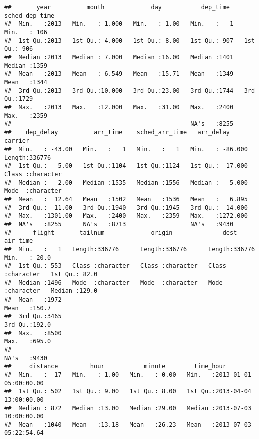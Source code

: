 \documentclass{article}\usepackage[]{graphicx}\usepackage[]{xcolor}
\makeatletter
\newenvironment{kframe}{%
 \def\at@end@of@kframe{}%
 \ifinner\ifhmode%
  \def\at@end@of@kframe{\end{minipage}}%
  \begin{minipage}{\columnwidth}%
 \fi\fi%
 \def\FrameCommand##1{\hskip\@totalleftmargin \hskip-\fboxsep
 \colorbox{shadecolor}{##1}\hskip-\fboxsep
     \hskip-\linewidth \hskip-\@totalleftmargin \hskip\columnwidth}%
 \MakeFramed {\advance\hsize-\width
   \@totalleftmargin\z@ \linewidth\hsize
   \@setminipage}}%
 {\par\unskip\endMakeFramed%
 \at@end@of@kframe}
\newenvironment{knitrout}{}{} %
\makeatother
\begin{document}
\begin{knitrout}
\begin{kframe}
\begin{alltt}
\end{alltt}
\begin{verbatim}
##       year          month             day           dep_time    sched_dep_time
##  Min.   :2013   Min.   : 1.000   Min.   : 1.00   Min.   :   1   Min.   : 106  
##  1st Qu.:2013   1st Qu.: 4.000   1st Qu.: 8.00   1st Qu.: 907   1st Qu.: 906  
##  Median :2013   Median : 7.000   Median :16.00   Median :1401   Median :1359  
##  Mean   :2013   Mean   : 6.549   Mean   :15.71   Mean   :1349   Mean   :1344  
##  3rd Qu.:2013   3rd Qu.:10.000   3rd Qu.:23.00   3rd Qu.:1744   3rd Qu.:1729  
##  Max.   :2013   Max.   :12.000   Max.   :31.00   Max.   :2400   Max.   :2359  
##                                                  NA's   :8255                 
##    dep_delay          arr_time    sched_arr_time   arr_delay          carrier         
##  Min.   : -43.00   Min.   :   1   Min.   :   1   Min.   : -86.000   Length:336776     
##  1st Qu.:  -5.00   1st Qu.:1104   1st Qu.:1124   1st Qu.: -17.000   Class :character  
##  Median :  -2.00   Median :1535   Median :1556   Median :  -5.000   Mode  :character  
##  Mean   :  12.64   Mean   :1502   Mean   :1536   Mean   :   6.895                     
##  3rd Qu.:  11.00   3rd Qu.:1940   3rd Qu.:1945   3rd Qu.:  14.000                     
##  Max.   :1301.00   Max.   :2400   Max.   :2359   Max.   :1272.000                     
##  NA's   :8255      NA's   :8713                  NA's   :9430                         
##      flight       tailnum             origin              dest              air_time    
##  Min.   :   1   Length:336776      Length:336776      Length:336776      Min.   : 20.0  
##  1st Qu.: 553   Class :character   Class :character   Class :character   1st Qu.: 82.0  
##  Median :1496   Mode  :character   Mode  :character   Mode  :character   Median :129.0  
##  Mean   :1972                                                            Mean   :150.7  
##  3rd Qu.:3465                                                            3rd Qu.:192.0  
##  Max.   :8500                                                            Max.   :695.0  
##                                                                          NA's   :9430   
##     distance         hour           minute        time_hour                     
##  Min.   :  17   Min.   : 1.00   Min.   : 0.00   Min.   :2013-01-01 05:00:00.00  
##  1st Qu.: 502   1st Qu.: 9.00   1st Qu.: 8.00   1st Qu.:2013-04-04 13:00:00.00  
##  Median : 872   Median :13.00   Median :29.00   Median :2013-07-03 10:00:00.00  
##  Mean   :1040   Mean   :13.18   Mean   :26.23   Mean   :2013-07-03 05:22:54.64  

\end{verbatim}
\end{kframe}
\end{knitrout}
\end{document}
